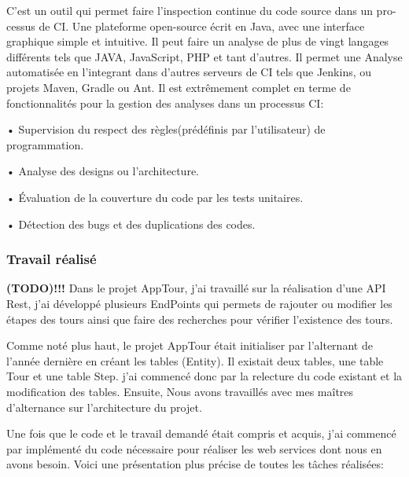 \documentclass[12pt]{article}
\begin{document}
C’est un outil qui permet faire l’inspection continue du code source dans un pro-cessus de CI. Une plateforme open-source écrit en Java, avec une interface graphique simple et intuitive. Il peut faire un analyse de plus de vingt langages différents tels que JAVA, JavaScript, PHP et tant d’autres.
Il permet une Analyse automatisée en l’integrant dans d’autres serveurs de CI tels que Jenkins, ou projets Maven, Gradle ou Ant. Il est extrêmement complet en terme de fonctionnalités pour la gestion des analyses dans un processus CI:

• Supervision du respect des règles(prédéfinis par l’utilisateur) de programmation.

• Analyse des designs ou l’architecture.

• Évaluation de la couverture du code par les tests unitaires.

• Détection des bugs et des duplications des codes.\newline
 
\subsubsection{Travail réalisé}
\textbf{(TODO)!!!}\newline
Dans le projet AppTour, j'ai travaillé sur la réalisation d'une API Rest, j'ai développé plusieurs EndPoints qui permets de rajouter ou modifier les étapes des tours ainsi que faire des recherches pour vérifier l’existence des tours. 

Comme noté plus haut, le projet AppTour était initialiser par l'alternant de l'année dernière en créant les tables (Entity). Il existait deux tables, une table Tour et une table Step. j'ai commencé donc par la relecture du code existant et la modification des tables.
Ensuite, Nous avons travaillés avec mes maîtres d'alternance sur l'architecture du projet.

Une fois que le code et le travail demandé était compris et acquis, j'ai commencé par implémenté du code nécessaire pour réaliser les web services dont nous en avons besoin. Voici une présentation plus précise de toutes les tâches réalisées:   
\end{document}
